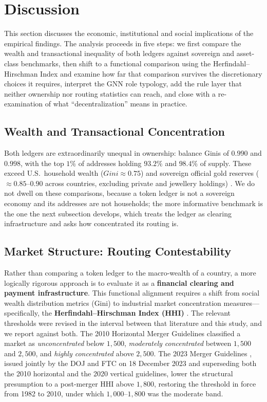 \documentclass[final,5p,times]{elsarticle}
\begin{document}
\section{Discussion}
\label{sec:discussion}

This section discusses the economic, institutional and social implications of the empirical findings. The analysis proceeds in five steps: we first compare the wealth and transactional inequality of both ledgers against sovereign and asset-class benchmarks, then shift to a functional comparison using the Herfindahl--Hirschman Index and examine how far that comparison survives the discretionary choices it requires, interpret the GNN role typology, add the rule layer that neither ownership nor routing statistics can reach, and close with a re-examination of what ``decentralization'' means in practice.

\subsection{Wealth and Transactional Concentration}
Both ledgers are extraordinarily unequal in ownership: balance Ginis of
$0.990$ and $0.998$, with the top $1\%$ of addresses holding $93.2\%$ and
$98.4\%$ of supply. These exceed U.S.\ household wealth ($Gini \approx 0.75$)
\cite{ubs2024wealth} and sovereign official gold reserves ($\approx 0.85$--$0.90$
across countries, excluding private and jewellery holdings) \cite{wgc2024gold}.
We do not dwell on these comparisons, because a token ledger is not a
sovereign economy and its addresses are not households; the more
informative benchmark is the one the next subsection develops, which treats
the ledger as clearing infrastructure and asks how concentrated its routing
is.

\subsection{Market Structure: Routing Contestability}
\label{sec:hhi}
Rather than comparing a token ledger to the macro-wealth of a country, a more
logically rigorous approach is to evaluate it as a \textbf{financial
clearing and payment infrastructure}. This functional alignment requires a
shift from social wealth distribution metrics (Gini) to industrial market
concentration measures---specifically, the \textbf{Herfindahl--Hirschman
Index (HHI)} \cite{doj2010horizontal}. The relevant thresholds were revised in
the interval between that literature and this study, and we report against
both. The 2010
Horizontal Merger Guidelines \cite{doj2010horizontal} classified a market as
\textit{unconcentrated} below $1{,}500$, \textit{moderately concentrated}
between $1{,}500$ and $2{,}500$, and \textit{highly concentrated} above
$2{,}500$. The 2023 Merger Guidelines \cite{doj2023merger}, issued jointly by
the DOJ and FTC on 18 December 2023 and superseding both the 2010 horizontal
and the 2020 vertical guidelines, lower the structural presumption to a
post-merger HHI above $1{,}800$, restoring the threshold in force from 1982
to 2010, under which $1{,}000$--$1{,}800$ was the moderate band.
\end{document}
